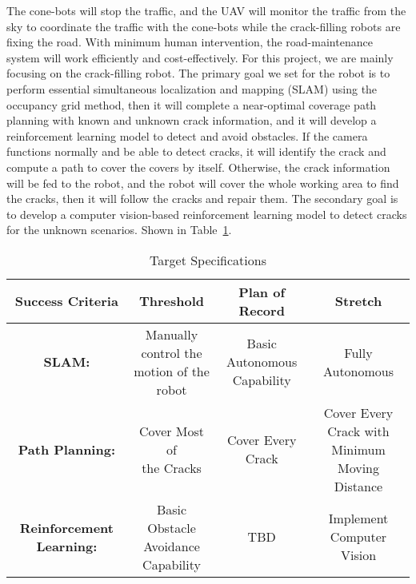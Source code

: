 \documentclass{article}
\begin{document}
The cone-bots will stop the traffic, and the UAV will monitor the traffic from the sky to coordinate the traffic with the cone-bots while the crack-filling robots are fixing the road. With minimum human intervention, the road-maintenance system will work efficiently and cost-effectively. For this project, we are mainly focusing on the crack-filling robot. The primary goal we set for the robot is to perform essential simultaneous localization and mapping (SLAM) using the occupancy grid method, then it will complete a near-optimal coverage path planning with known and unknown crack information, and it will develop a reinforcement learning model to detect and avoid obstacles. If the camera functions normally and be able to detect cracks, it will identify the crack and compute a path to cover the covers by itself. Otherwise, the crack information will be fed to the robot, and the robot will cover the whole working area to find the cracks, then it will follow the cracks and repair them. The secondary goal is to develop a computer vision-based reinforcement learning model to detect cracks for the unknown scenarios. Shown in Table~\ref{tab:criteria}. \par

\begin{table}[htbp]
\centering
\begin{tabular}{c| c | c| c}
\hline
\textbf{Success Criteria} & \textbf{Threshold} & \textbf{Plan of Record} &\textbf{Stretch}\\
\hline
\textbf{SLAM:} & \makecell{Manually control the \\motion of the robot} & \makecell{Basic Autonomous \\Capability} & Fully Autonomous \\
\hline
\textbf{Path Planning:} & \makecell{Cover Most of \\ the Cracks} & Cover Every Crack & \makecell{Cover Every Crack with \\Minimum Moving Distance}\\
\hline
\textbf{Reinforcement Learning:} & \makecell{Basic Obstacle \\Avoidance Capability} & TBD & Implement Computer Vision\\
\hline
\end{tabular}
\caption{Target Specifications}
\label{tab:criteria}
\end{table}





\end{document}
